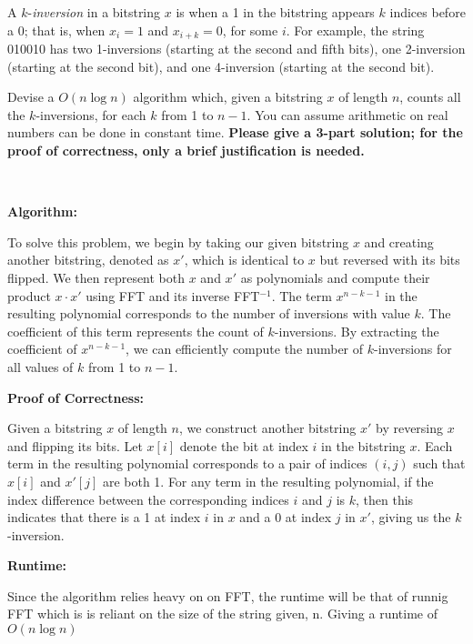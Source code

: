 \documentclass[11pt]{article}
\begin{document}
\newpage

A $k$-\textit{inversion} in a bitstring $x$ is when a 1 in the bitstring appears $k$ indices before a 0; that is, when $x_i=1$ and $x_{i+k}=0$, for some $i$. For example, the string 010010 has two 1-inversions (starting at the second and fifth bits), one 2-inversion (starting at the second bit), and one 4-inversion (starting at the second bit).

Devise a $O(n \log n)$ algorithm which, given a bitstring $x$ of length $n$, counts all the $k$-inversions, for each $k$ from 1 to $n-1$. You can assume arithmetic on real numbers can be done in constant time. \textbf{Please give a 3-part solution; for the proof of correctness, only a brief justification is needed.}\\
\begin{solution}\\
    \begin{center}
        \textbf{Algorithm: }
    \end{center}
    To solve this problem, we begin by taking our given bitstring $x$ and creating another bitstring, denoted as $x'$, which is identical to $x$ but reversed with its bits flipped. We then represent both $x$ and $x'$ as polynomials and compute their product $x \cdot x'$ using FFT and its inverse FFT$^{-1}$. 
    The term $x^{n-k-1}$ in the resulting polynomial corresponds to the number of inversions with value $k$. The coefficient of this term represents the count of $k$-inversions.
    By extracting the coefficient of $x^{n-k-1}$, we can efficiently compute the number of $k$-inversions for all values of $k$ from 1 to $n-1$.
    \begin{center}
        \textbf{Proof of Correctness: }
    \end{center}
    Given a bitstring $x$ of length $n$, we construct another bitstring $x'$ by reversing $x$ and flipping its bits. Let $x[i]$ denote the bit at index $i$ in the bitstring $x$.
    Each term in the resulting polynomial corresponds to a pair of indices $(i, j)$ such that $x[i]$ and $x'[j]$ are both 1. 
    For any term in the resulting polynomial, if the index difference between the corresponding indices $i$ and $j$ is $k$, then this indicates that there is a 1 at index $i$ in $x$ and a 0 at index $j$ in $x'$, giving us the $k$-inversion.
    \begin{center}
        \textbf{Runtime: }
    \end{center}
    Since the algorithm relies heavy on on FFT, the runtime will be that of
    runnig FFT which is is reliant on the size of the string given, n. Giving a runtime of $O(n\log n)$
\end{solution}
\newpage
\end{document}

